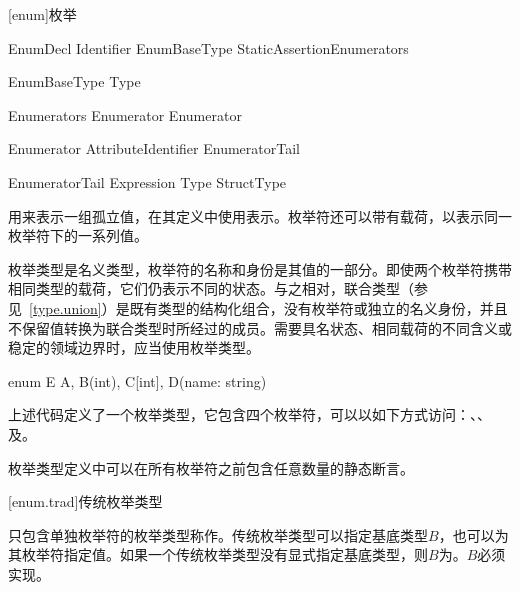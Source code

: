 
[enum]{枚举}

\begin{bnf}{EnumDecl}
     Identifier EnumBaseType\bnfq \terminal{\{} StaticAssertion\bnfs Enumerators \terminal{\}}
\end{bnf}

\begin{bnf}{EnumBaseType}
    \terminal{:} Type
\end{bnf}

\begin{bnf}{Enumerators}
    Enumerator \bnflp \terminal{,} Enumerator \bnfrp\bnfs \terminal{,}\bnfq
\end{bnf}

\begin{bnf}{Enumerator}
    Attribute\bnfq Identifier EnumeratorTail\bnfq
\end{bnf}

\begin{bnf}{EnumeratorTail}
    \terminal{=} Expression \br
    \terminal{[} Type \terminal{]} \br
    StructType
\end{bnf}

\pnum
{}用来表示一组孤立值，在其定义中使用表示。枚举符还可以带有载荷，以表示同一枚举符下的一系列值。

\pnum
枚举类型是名义类型，枚举符的名称和身份是其值的一部分。即使两个枚举符携带相同类型的载荷，它们仍表示不同的状态。与之相对，联合类型（参见~\ref{type.union}）是既有类型的结构化组合，没有枚举符或独立的名义身份，并且不保留值转换为联合类型时所经过的成员。需要具名状态、相同载荷的不同含义或稳定的领域边界时，应当使用枚举类型。

\enterexample
\begin{codeblock}

enum E {
    A,
    B(int),
    C[int],
    D(name: string)
}

\end{codeblock}

上述代码定义了一个枚举类型，它包含四个枚举符，可以以如下方式访问：、、及。
\exitexample

\pnum
枚举类型定义中可以在所有枚举符之前包含任意数量的静态断言。

[enum.trad]{传统枚举类型}

\pnum
只包含单独枚举符的枚举类型称作。传统枚举类型可以指定基底类型$B$，也可以为其枚举符指定值。如果一个传统枚举类型没有显式指定基底类型，则$B$为。$B$必须实现。

